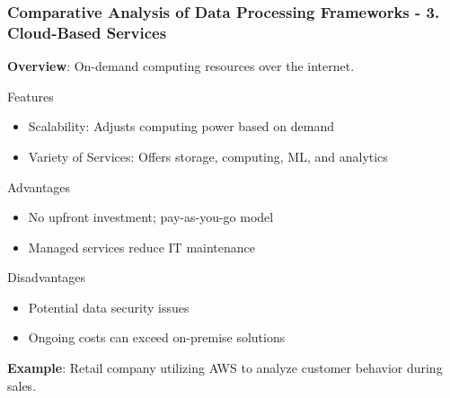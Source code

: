 \documentclass[aspectratio=169]{beamer}
\begin{document}
\begin{frame}[fragile]
    \frametitle{Comparative Analysis of Data Processing Frameworks - 3. Cloud-Based Services}
    \textbf{Overview}: On-demand computing resources over the internet.

    \begin{block}{Features}
        \begin{itemize}
            \item Scalability: Adjusts computing power based on demand
            \item Variety of Services: Offers storage, computing, ML, and analytics
        \end{itemize}
    \end{block}
    
    \begin{block}{Advantages}
        \begin{itemize}
            \item No upfront investment; pay-as-you-go model
            \item Managed services reduce IT maintenance
        \end{itemize}
    \end{block}
    
    \begin{block}{Disadvantages}
        \begin{itemize}
            \item Potential data security issues
            \item Ongoing costs can exceed on-premise solutions
        \end{itemize}
    \end{block}
    
    \textbf{Example}: Retail company utilizing AWS to analyze customer behavior during sales.
\end{frame}
\end{document}
